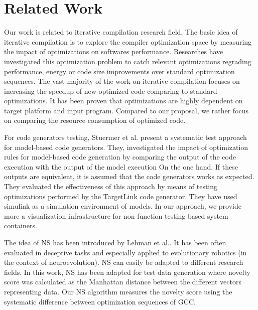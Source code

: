 \section{Related Work}
Our work is related to iterative compilation research field.
The basic idea of iterative compilation is to explore
the compiler optimization space by measuring the impact of optimizations on softwares performance.
Researches have investigated this optimization problem to catch relevant optimizations regrading performance, energy or code size improvements over standard optimization sequences. The vast majority of the work on iterative compilation focuses on increasing the speedup of new optimized code comparing to standard optimizations. It has been proven that optimizations are highly dependent on target platform and input program. Compared to our proposal, we rather focus on comparing the resource consumption of optimized code.

For code generators testing, Stuermer et al.\cite{stuermer2007systematic} present a systematic test
approach for model-based code generators. They, investigated  the impact of optimization rules for model-based code generation by comparing the output of the code execution with the output of the model execution On the one hand. If these outputs are equivalent, it is assumed that the code generators works as expected. They evaluated the effectiveness of this approach by means of testing optimizations performed by the TargetLink code generator. They have used simulink as a simulation environment of models. In our approach, we provide more a visualization infrastructure for non-function testing based system containers.

The idea of NS has been introduced by Lehman et al.\cite{lehman2008exploiting}. It has been often evaluated in deceptive tasks and especially applied to evolutionary robotics (in the context of neuroevolution)\cite{risi2010evolving,krvcah2012solving}. NS can easily be adapted to different research fields. In this work\cite{boussaa2015novelty}, NS has been adapted for test data generation where novelty score was calculated as the Manhattan distance between the different vectors representing data. Our NS algorithm measures the novelty score using the systematic difference between optimization sequences of GCC.
